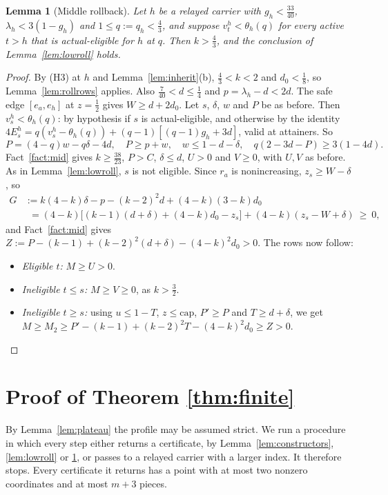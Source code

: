 \documentclass[11pt,a4paper]{article}
\numberwithin{equation}{section}
\newtheorem{lemma}[theorem]{Lemma}
\theoremstyle{definition}
\newcommand{\kcap}{\mathrm{cap}}
\begin{document}
\begin{lemma}[Middle rollback]\label{lem:midroll}Let $h$ be a relayed carrier with $g_h<\frac{33}{40}$, $\lambda_h<3(1-g_h)$ and
$1\le q:=q_h<\frac43$, and suppose $v^h_t<\theta_h(q)$ for every active $t>h$
that is actual-eligible for $h$ at $q$. Then $k>\frac43$, and the conclusion of
Lemma~\ref{lem:lowroll} holds.
\end{lemma}

\begin{proof}
By (H3) at $h$ and Lemma~\ref{lem:inherit}(b), $\frac43<k<2$ and $d_0<\frac18$,
so Lemma~\ref{lem:rollrows} applies. Also $\frac7{40}<d\le\frac14$ and
$p=\lambda_h-d<2d$. The safe edge $[e_a,e_h]$ at $z=\frac12$ gives
$W\ge d+2d_0$. Let $s$, $\delta$, $w$ and $P$ be as before. Then
$v^h_s<\theta_h(q)$: by hypothesis if $s$ is actual-eligible, and otherwise by
the identity $4E^h_s=q(v^h_s-\theta_h(q))+(q-1)[(q-1)g_h+3d]$, valid at
attainers. So
\[
P=(4-q)w-q\delta-4d,\quad P\ge p+w,\quad w\le1-d-\delta,\quad
q(2-3d-P)\ge3(1-4d).
\]
Fact~\ref{fact:mid} gives $k\ge\frac{38}{23}$, $P>C$, $\delta\le d$, $U>0$ and
$V\ge0$, with $U,V$ as before. As in Lemma~\ref{lem:lowroll}, $s$ is not
eligible. Since $r_a$ is nonincreasing, $z_s\ge W-\delta$, so
\begin{align*}
G&:=k(4-k)\delta-p-(k-2)^2d+(4-k)(3-k)d_0\\
&\phantom{:}=(4-k)\bigl[(k-1)(d+\delta)+(4-k)d_0-z_s\bigr]+(4-k)(z_s-W+\delta)\ \ge\ 0,
\end{align*}
and Fact~\ref{fact:mid} gives $Z:=P-(k-1)+(k-2)^2(d+\delta)-(4-k)^2d_0>0$. The
rows now follow:
\begin{itemize}
\item \emph{Eligible $t$:} $M\ge U>0$.
\item \emph{Ineligible $t\le s$:} $M\ge V\ge0$, as $k>\frac32$.
\item \emph{Ineligible $t\ge s$:} using $u\le1-T$, $z\le\kcap$, $P'\ge P$ and
$T\ge d+\delta$, we get $M\ge M_2\ge P'-(k-1)+(k-2)^2T-(4-k)^2d_0\ge Z>0$.
\qedhere
\end{itemize}
\end{proof}

\section{Proof of Theorem \ref{thm:finite}}\label{sec:selector}

By Lemma~\ref{lem:plateau} the profile may be assumed strict. We run a procedure
in which every step either returns a certificate, by
Lemma~\ref{lem:constructors}, \ref{lem:lowroll} or \ref{lem:midroll}, or passes
to a relayed carrier with a larger index. It therefore stops. Every certificate
it returns has a point with at most two nonzero coordinates and at most
$m+3$ pieces.
\end{document}
